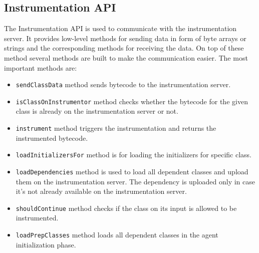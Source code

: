 \subsection{Instrumentation API}
The Instrumentation API is used to communicate with the instrumentation server. It provides low-level methods for sending data in form of byte arrays or strings and the corresponding methods for receiving the data. On top of these method several methods are built to make the communication easier. The most important methods are:
\begin{itemize}
	\item \texttt{sendClassData} method sends bytecode to the instrumentation server.
	\item \texttt{isClassOnInstrumentor} method checks whether the bytecode for the given class is already on the instrumentation server or not.
	\item \texttt{instrument} method triggers the instrumentation and returns the instrumented bytecode.
	\item \texttt{loadInitializersFor} method is for loading the initializers for specific class.
	\item \texttt{loadDependencies} method is used to load all dependent classes and upload them on the instrumentation server. The dependency is uploaded only in case it's not already available on the instrumentation server.
	\item \texttt{shouldContinue} method checks if the class on its input is allowed to be instrumented.
	\item \texttt{loadPrepClasses} method loads all dependent classes in the agent initialization phase.
\end{itemize}

